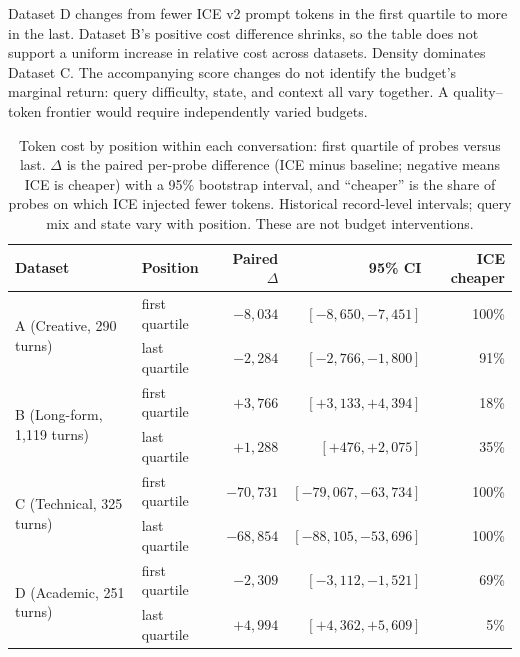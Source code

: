 \documentclass[11pt,a4paper]{article}
\begin{document}
Dataset D changes from fewer ICE v2 prompt tokens in the first quartile to more in the last. Dataset B's positive cost difference shrinks, so the table does not support a uniform increase in relative cost across datasets. Density dominates Dataset C. The accompanying score changes do not identify the budget's marginal return: query difficulty, state, and context all vary together. A quality--token frontier would require independently varied budgets.

\begin{table}[htbp]
\centering
\small
\caption{Token cost by position within each conversation: first quartile of probes versus last. $\Delta$ is the paired per-probe difference (ICE minus baseline; negative means ICE is cheaper) with a 95\% bootstrap interval, and ``cheaper'' is the share of probes on which ICE injected fewer tokens. Historical record-level intervals; query mix and state vary with position. These are not budget interventions.}
\label{tab:token-crossover}
\begin{tabular}{@{}llrrr@{}}
\toprule
\textbf{Dataset} & \textbf{Position} & \textbf{Paired $\Delta$} & \textbf{95\% CI} & \textbf{ICE cheaper} \\
\midrule
\multirow{2}{*}{A (Creative, 290 turns)} & first quartile & $-8{,}034$ & $[-8{,}650, -7{,}451]$ & 100\% \\
                                          & last quartile  & $-2{,}284$ & $[-2{,}766, -1{,}800]$ & 91\% \\
\midrule
\multirow{2}{*}{B (Long-form, 1{,}119 turns)} & first quartile & $+3{,}766$ & $[+3{,}133, +4{,}394]$ & 18\% \\
                                               & last quartile  & $+1{,}288$ & $[+476, +2{,}075]$ & 35\% \\
\midrule
\multirow{2}{*}{C (Technical, 325 turns)} & first quartile & $-70{,}731$ & $[-79{,}067, -63{,}734]$ & 100\% \\
                                           & last quartile  & $-68{,}854$ & $[-88{,}105, -53{,}696]$ & 100\% \\
\midrule
\multirow{2}{*}{D (Academic, 251 turns)} & first quartile & $-2{,}309$ & $[-3{,}112, -1{,}521]$ & 69\% \\
                                          & last quartile  & $+4{,}994$ & $[+4{,}362, +5{,}609]$ & 5\% \\
\bottomrule
\end{tabular}
\end{table}
\end{document}
